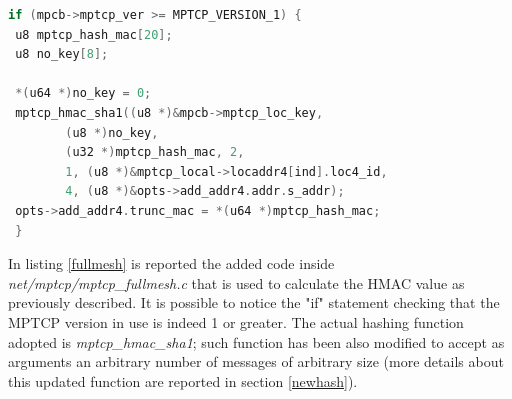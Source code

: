 \begin{lstlisting}[language=c, caption=\textit{New ADD\_ADDR HMAC calculation (outgoing packet, IPv4)}, label=fullmesh]
 if (mpcb->mptcp_ver >= MPTCP_VERSION_1) {
 u8 mptcp_hash_mac[20];
 u8 no_key[8];

 *(u64 *)no_key = 0;
 mptcp_hmac_sha1((u8 *)&mpcb->mptcp_loc_key,
 		(u8 *)no_key,
		(u32 *)mptcp_hash_mac, 2,
		1, (u8 *)&mptcp_local->locaddr4[ind].loc4_id,
		4, (u8 *)&opts->add_addr4.addr.s_addr);
 opts->add_addr4.trunc_mac = *(u64 *)mptcp_hash_mac;
 }
\end{lstlisting}

In listing \ref{fullmesh} is reported the added code inside \textit{net/mptcp/mptcp\_fullmesh.c} that is used to calculate the HMAC value as previously described. It is possible to notice the "if" statement checking that the MPTCP version in use is indeed 1 or greater. The actual hashing function adopted is \textit{mptcp\_hmac\_sha1}; such function has been also modified to accept as arguments an arbitrary number of messages of arbitrary size (more details about this updated function are reported in section \ref{newhash}). 


